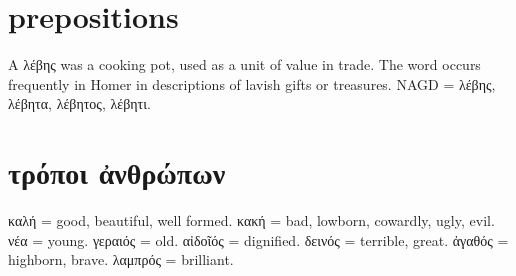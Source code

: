 \documentclass[12pt,openany]{book}
\newenvironment{notes}{\vfill\scriptsize\begin{flushright}}{\end{flushright}}
\newcommand{\fig}[1]{\begin{center}\end{center}}
\begin{document}

\chapter{prepositions}

\fig{prepositions/prepositions.svg}

\begin{notes}
A λέβης was a cooking pot, used as a unit of value in trade. The word occurs frequently in Homer in descriptions
of lavish gifts or treasures. NAGD = λέβης, λέβητα, λέβητος, λέβητι.
\end{notes}


\chapter{τρόποι ἀνθρώπων}

\fig{character/character.svg}

\begin{notes}
καλή = good, beautiful, well formed. κακή = bad, lowborn, cowardly, ugly, evil. νέα = young.
γεραιός = old. αἰδοῖός = dignified. δεινός = terrible, great. ἀγαθός = highborn, brave.
λαμπρός = brilliant.
\end{notes}
\end{document}
